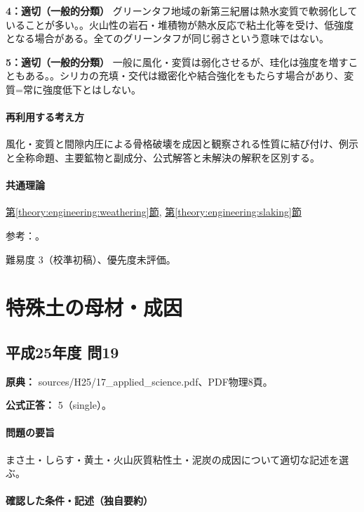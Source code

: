 \noindent\textbf{4：適切（一般的分類）} グリーンタフ地域の新第三紀層は熱水変質で軟弱化していることが多い。。火山性の岩石・堆積物が熱水反応で粘土化等を受け、低強度となる場合がある。全てのグリーンタフが同じ弱さという意味ではない。\par

\noindent\textbf{5：適切（一般的分類）} 一般に風化・変質は弱化させるが、珪化は強度を増すこともある。。シリカの充填・交代は緻密化や結合強化をもたらす場合があり、変質=常に強度低下とはしない。\par

\paragraph{再利用する考え方} 風化・変質と間隙内圧による骨格破壊を成因と観察される性質に結び付け、例示と全称命題、主要鉱物と副成分、公式解答と未解決の解釈を区別する。

\paragraph{共通理論} \hyperref[theory:engineering:weathering]{第\ref*{theory:engineering:weathering}節}, \hyperref[theory:engineering:slaking]{第\ref*{theory:engineering:slaking}節}

\par 参考：\cite{slaking1979,slaking2006,jseg_engineering_faq}。

\par 難易度 3（校準初稿）、優先度未評価。

\section{特殊土の母材・成因}

\subsection{平成25年度 問19}
\label{q:h25-reg-applied-19}

\noindent\textbf{原典：} sources/H25/17\_applied\_science.pdf、PDF物理8頁。

\textbf{公式正答：} 5（single）。

\paragraph{問題の要旨} まさ土・しらす・黄土・火山灰質粘性土・泥炭の成因について適切な記述を選ぶ。

\paragraph{確認した条件・記述（独自要約）}\mbox{}\par

